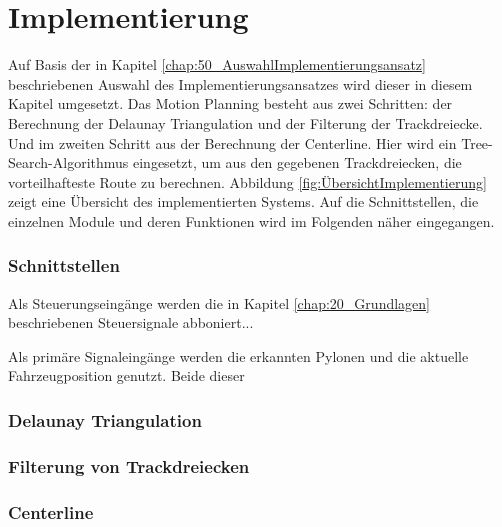 
\chapter{Implementierung}
Auf Basis der in Kapitel \ref{chap:50_AuswahlImplementierungsansatz} beschriebenen Auswahl des Implementierungsansatzes wird dieser in 
diesem Kapitel umgesetzt. Das Motion Planning besteht aus zwei Schritten: der Berechnung der Delaunay Triangulation und der Filterung
der Trackdreiecke. Und im zweiten Schritt aus der Berechnung der Centerline. Hier wird ein Tree-Search-Algorithmus eingesetzt, um aus den 
gegebenen Trackdreiecken, die vorteilhafteste Route zu berechnen. Abbildung \ref{fig:ÜbersichtImplementierung} zeigt eine Übersicht des 
implementierten Systems. Auf die Schnittstellen, die einzelnen Module und deren Funktionen wird im Folgenden näher eingegangen. 

\subsection{Schnittstellen}
Als Steuerungseingänge werden die in Kapitel \ref{chap:20_Grundlagen} beschriebenen Steuersignale abboniert...

Als primäre Signaleingänge werden die erkannten Pylonen und die aktuelle Fahrzeugposition genutzt. Beide dieser 

\subsection{Delaunay Triangulation}

\subsection{Filterung von Trackdreiecken}

\subsection{Centerline}

